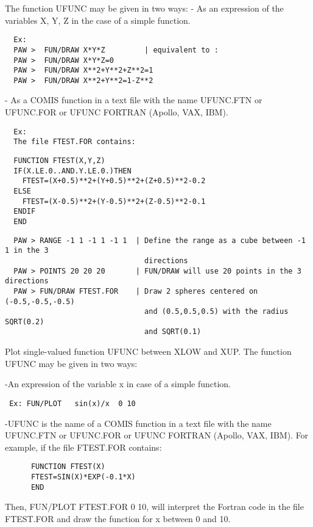 The function UFUNC may be given in two ways:
- As an expression of the variables X, Y, Z in the case of a simple function.
\begin{verbatim}
  Ex:
  PAW >  FUN/DRAW X*Y*Z         | equivalent to :
  PAW >  FUN/DRAW X*Y*Z=0
  PAW >  FUN/DRAW X**2+Y**2+Z**2=1
  PAW >  FUN/DRAW X**2+Y**2=1-Z**2
\end{verbatim}
- As a COMIS function in a text file with the name UFUNC.FTN or UFUNC.FOR
or UFUNC FORTRAN (Apollo, VAX, IBM).
\begin{verbatim}
  Ex:
  The file FTEST.FOR contains:
\end{verbatim}

\begin{verbatim}
  FUNCTION FTEST(X,Y,Z)
  IF(X.LE.0..AND.Y.LE.0.)THEN
    FTEST=(X+0.5)**2+(Y+0.5)**2+(Z+0.5)**2-0.2
  ELSE
    FTEST=(X-0.5)**2+(Y-0.5)**2+(Z-0.5)**2-0.1
  ENDIF
  END
\end{verbatim}

\begin{verbatim}
  PAW > RANGE -1 1 -1 1 -1 1  | Define the range as a cube between -1 1 in the 3
                                directions
  PAW > POINTS 20 20 20       | FUN/DRAW will use 20 points in the 3 directions
  PAW > FUN/DRAW FTEST.FOR    | Draw 2 spheres centered on (-0.5,-0.5,-0.5)
                                and (0.5,0.5,0.5) with the radius SQRT(0.2)
                                and SQRT(0.1)
\end{verbatim}
\ENDTEXT

\BEGARG
{}
\ENDARG
\BEGTEXT
Plot single-valued function UFUNC between XLOW and XUP.
The function UFUNC may be given in two ways:

-An expression of the variable x in case of a simple function.
\begin{verbatim}
 Ex: FUN/PLOT   sin(x)/x  0 10
\end{verbatim}
-UFUNC is the name of a COMIS function in a text file with the
name UFUNC.FTN or UFUNC.FOR or UFUNC FORTRAN (Apollo, VAX, IBM).
For example, if the file FTEST.FOR contains:
\begin{verbatim}
      FUNCTION FTEST(X)
      FTEST=SIN(X)*EXP(-0.1*X)
      END
\end{verbatim}
Then, FUN/PLOT FTEST.FOR 0 10, will interpret the Fortran
code in the file FTEST.FOR and draw the function for x
between 0 and 10.

